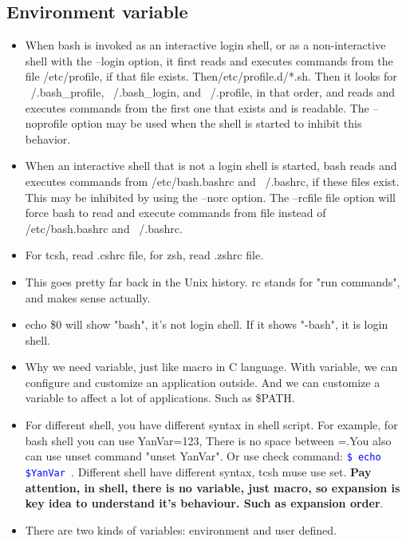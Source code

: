 \documentclass[a4paper,12pt,twoside]{book}
\newcommand{\linuxcommand}[1]{\texttt{\textcolor{blue}{\$ #1 \Pisymbol{psy}{191}}}}
\begin{document}
\subsection{Environment variable}
\begin{itemize} 
		\item When bash is invoked as an interactive login shell, or as a non-interactive shell with the --login option, it first reads and executes commands from the file /etc/profile, if that file exists. Then/etc/profile.d/*.sh. Then it looks for ~/.bash\_profile,  ~/.bash\_login, and ~/.profile, in that order, and reads and executes commands from the first one that exists and is readable. The --noprofile option may be used when the shell is started to inhibit this behavior.
		
		\item When an interactive shell that is not a login shell is started, bash reads and executes commands from  /etc/bash.bashrc and ~/.bashrc, if these files exist. This may be inhibited by using the --norc option. The --rcfile file option will force bash to read and execute commands from file instead of /etc/bash.bashrc and  ~/.bashrc.	

		\item For tcsh, read .cshrc file, for zsh, read .zshrc file.

		\item This goes pretty far back in the Unix history. rc stands for "run commands", and makes sense actually.

		\item echo \$0 will show "bash", it's not login shell. If it shows "-bash", it is login shell.  
	
		\item Why we need variable, just like macro in C language. With variable, we can configure and customize an application outside. And we can customize a variable to affect a lot of applications. Such as \$PATH.
				
		\item For different shell, you have different syntax in shell script. For example, for bash shell you can use YanVar=123, There is no space between =.You also can use unset command "unset YanVar". Or use check command: \linuxcommand{echo \$YanVar}. Different shell have different syntax, tcsh muse use set. \textbf{Pay attention, in shell, there is no variable, just macro, so expansion is key idea to understand it's behaviour. Such as expansion order}.

		\item There are two kinds of variables: environment and user defined.


\end{itemize}
\end{document}
